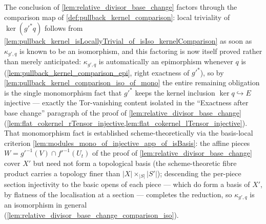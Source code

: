 \begin{remark}
  \label{rem:relative_divisor_base_change_kernel_comparison}
  The conclusion of \cref{lem:relative_divisor_base_change} factors through
  the comparison map of \cref{def:pullback_kernel_comparison}: local
  triviality of \(\ker(g'^{*} q)\) follows from
  \cref{lem:pullback_kernel_isLocallyTrivial_of_isIso_kernelComparison} as
  soon as \(\kappa_{g',q}\) is known to be an isomorphism, and this
  factoring is now itself proved rather than merely anticipated:
  \(\kappa_{g',q}\) is automatically an epimorphism whenever \(q\) is
  (\cref{lem:pullback_kernel_comparison_epi}, right exactness of
  \(g'^{*}\)), so by \cref{lem:pullback_kernel_comparison_iso_of_mono} the
  entire remaining obligation is the single monomorphism fact that
  \(g'^{*}\) keeps the kernel inclusion \(\ker q \hookrightarrow E\)
  injective --- exactly the Tor-vanishing content isolated in the
  ``Exactness after base change'' paragraph of the proof of
  \cref{lem:relative_divisor_base_change}
  (\cref{lem:flat_cokernel_rTensor_injective,lem:flat_cokernel_lTensor_injective}).
  That monomorphism fact is established scheme-theoretically via the
  basis-local criterion \cref{lem:modules_mono_of_injective_app_of_isBasis}:
  the affine pieces \(W = g'^{-1}(V) \cap f'^{-1}(U_t)\) of the proof of
  \cref{lem:relative_divisor_base_change} cover \(X'\) but need not form a
  topological basis (the scheme-theoretic fibre product carries a
  topology finer than \(|X| \times_{|S|} |S'|\)); descending the
  per-piece section injectivity to the basic opens of each piece --- which
  do form a basis of \(X'\), by flatness of the localisation at a section
  --- completes the reduction, so \(\kappa_{g',q}\) is an isomorphism in
  general (\cref{lem:relative_divisor_base_change_comparison_iso}).
\end{remark}

